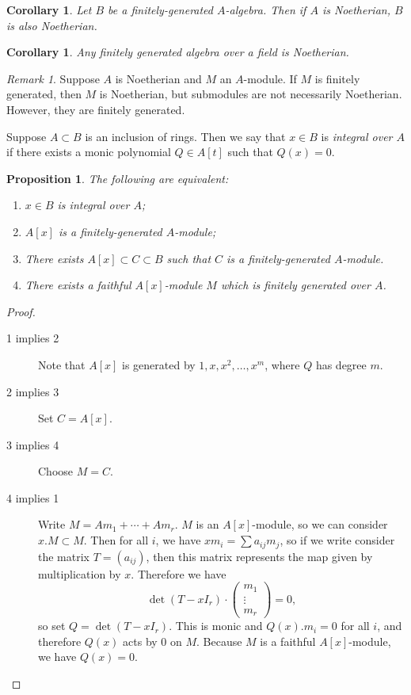 \documentclass[leqno, openany]{memoir}
\newtheorem{cor}[thm]{Corollary}
\newtheorem{prop}[thm]{Proposition}
\theoremstyle{definition}
\theoremstyle{remark}
\newtheorem{rmk}[thm]{Remark}
\theoremstyle{plain}
\theoremstyle{definition}
\theoremstyle{remark}
\begin{document}
\begin{cor}
    Let $B$ be a finitely-generated $A$-algebra. Then if $A$ is Noetherian, $B$ is also Noetherian.
\end{cor}

\begin{cor}
    Any finitely generated algebra over a field is Noetherian.
\end{cor}

\begin{rmk}
    Suppose $A$ is Noetherian and $M$ an $A$-module. If $M$ is finitely generated, then $M$ is Noetherian, but submodules are not necessarily Noetherian. However, they are finitely generated.
\end{rmk}

Suppose $A \subset B$ is an inclusion of rings. Then we say that $x \in B$ is 
\textit{integral over $A$} if there exists a monic polynomial $Q \in A[t]$ such that $Q(x) = 0$.

\begin{prop}
    \label{prop:integral}
    The following are equivalent:
    \begin{enumerate}
        \item $x \in B$ is integral over $A$;
        \item $A[x]$ is a finitely-generated $A$-module;
        \item There exists $A[x] \subset C \subset B$ such that $C$ is a finitely-generated $A$-module.
        \item There exists a faithful $A[x]$-module $M$ which is finitely generated over $A$.
    \end{enumerate}
\end{prop}

\begin{proof}
    \begin{description}
        \item[1 implies 2] Note that $A[x]$ is generated by $1,x,x^2, \ldots, x^m$, where $Q$ has degree $m$.
        \item[2 implies 3] Set $C = A[x]$.
        \item[3 implies 4] Choose $M = C$.
        \item[4 implies 1] Write $M = Am_1 + \cdots + A m_r$. $M$ is an $A[x]$-module, so we can consider $x . M \subset M$. Then for all $i$, we have $x m_i = \sum a_{ij} m_j$, so if we write consider the matrix $T = (a_{ij})$, then this matrix represents the map given by multiplication by $x$. Therefore we have
            \[ \det (T - x I_r) \cdot \begin{pmatrix}
                m_1 \\ \vdots \\ m_r
            \end{pmatrix} = 0, \]
            so set $Q = \det(T - x I_r)$. This is monic and $Q(x) . m_i = 0$ for all $i$, and therefore $Q(x)$ acts by $0$ on $M$. Because $M$ is a faithful $A[x]$-module, we have $Q(x) = 0$.
    \end{description}
\end{proof}
\end{document}
